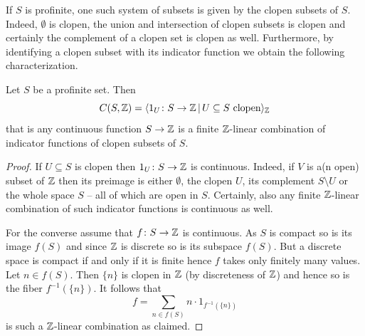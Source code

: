 If $S$ is profinite, one such system of subsets is given by the clopen subsets of $S$. Indeed, $\emptyset$ is clopen, the union and intersection of clopen subsets is clopen and certainly the complement of a clopen set is clopen as well. Furthermore, by identifying a clopen subset with its indicator function we obtain the following characterization.
\begin{lemma}
	\label{lemma: indicator functions generate}
	
	Let $S$ be a profinite set. Then
		$${C(S, {\mathbb{Z}})} = \langle 1_U\colon S\to {\mathbb{Z}}\,\vert\, U\subseteq S\text{ clopen}\rangle_{\mathbb{Z}}$$
	that is any continuous function $S\to {\mathbb{Z}}$ is a finite ${\mathbb{Z}}$-linear combination of indicator functions of clopen subsets of $S$.
\end{lemma}
\begin{proof}
	If $U\subseteq S$ is clopen then $1_U\colon S\to {\mathbb{Z}}$ is continuous. Indeed, if $V$ is a(n open) subset of ${\mathbb{Z}}$ then its preimage is either $\emptyset$, the clopen $U$, its complement $S\setminus U$ or the whole space $S$ -- all of which are open in $S$. Certainly, also any finite ${\mathbb{Z}}$-linear combination of such indicator functions is continuous as well.
	
	For the converse assume that $f\colon S\to {\mathbb{Z}}$ is continuous. As $S$ is compact so is its image $f(S)$ and since ${\mathbb{Z}}$ is discrete so is its subspace $f(S)$. But a discrete space is compact if and only if it is finite hence $f$ takes only finitely many values. Let $n\in f(S)$. Then $\{n\}$ is clopen in ${\mathbb{Z}}$ (by discreteness of ${\mathbb{Z}}$) and hence so is the fiber $f^{-1}(\{n\})$. It follows that
		$$f = \sum_{n\in f(S)} n \cdot 1_{f^{-1}(\{n\})}$$
	is such a ${\mathbb{Z}}$-linear combination as claimed.
\end{proof}

